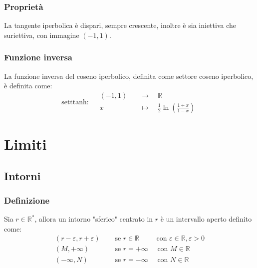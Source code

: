 \documentclass[a4paper]{article}
\newcommand\setttanh{\text{setttanh}}
\begin{document}
\subsubsection*{Proprietà}
La tangente iperbolica è dispari, sempre crescente, inoltre è sia iniettiva che suriettiva, con immagine \(\left( -1, 1 \right)\).

\subsubsection*{Funzione inversa}
La funzione inversa del coseno iperbolico, definita come settore coseno iperbolico, è definita come:
\[\setttanh : \quad
\begin{aligned}
	\left( -1, 1 \right) \quad &\to \quad \mathbb{R} \\
	x \quad &\mapsto \quad \frac{1}{2} \ln \left( \frac{1 + x}{1 - x} \right)
\end{aligned}
\]

\newpage

\section{Limiti}
\subsection{Intorni}
\subsubsection*{Definizione}
Sia \(r \in \mathbb{R}^*\), allora un intorno "sferico" centrato in \(r\) è un intervallo aperto definito come:
\begin{align*}
	\left( r - \varepsilon, r + \varepsilon \right) \quad & \text{ se } r \in \mathbb{R} \quad \;\;\;\; \text{ con } \varepsilon \in \mathbb{R}, \varepsilon > 0 \\
	\left( M, +\infty \right) \quad & \text{ se } r = + \infty \quad \text{ con } M \in \mathbb{R} \\
	\left( -\infty, N \right) \quad & \text{ se } r = - \infty \quad \text{ con } N \in \mathbb{R}
\end{align*}
\end{document}
